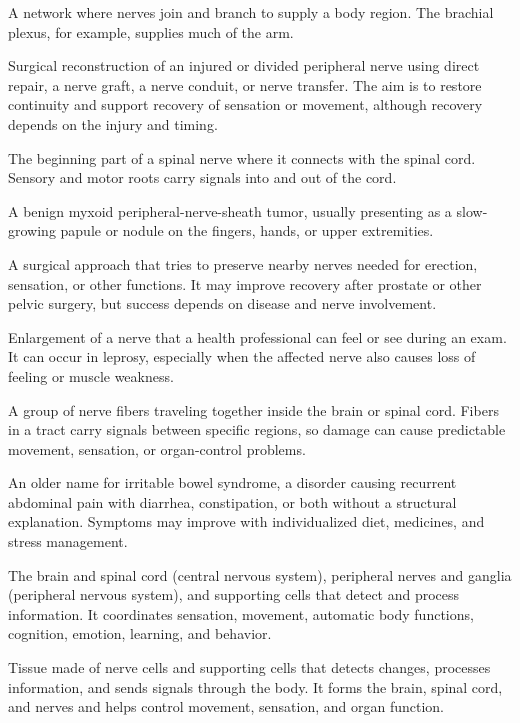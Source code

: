  A network where nerves join and branch to supply a body region. The brachial plexus, for example, supplies much of the arm.

 Surgical reconstruction of an injured or divided peripheral nerve using direct repair, a nerve graft, a nerve conduit, or nerve transfer. The aim is to restore continuity and support recovery of sensation or movement, although recovery depends on the injury and timing.

 The beginning part of a spinal nerve where it connects with the spinal cord. Sensory and motor roots carry signals into and out of the cord.

 A benign myxoid peripheral-nerve-sheath tumor, usually presenting as a slow-growing papule or nodule on the fingers, hands, or upper extremities.

 A surgical approach that tries to preserve nearby nerves needed for erection, sensation, or other functions. It may improve recovery after prostate or other pelvic surgery, but success depends on disease and nerve involvement.

 Enlargement of a nerve that a health professional can feel or see during an exam. It can occur in leprosy, especially when the affected nerve also causes loss of feeling or muscle weakness.

 A group of nerve fibers traveling together inside the brain or spinal cord. Fibers in a tract carry signals between specific regions, so damage can cause predictable movement, sensation, or organ-control problems.

 An older name for irritable bowel syndrome, a disorder causing recurrent abdominal pain with diarrhea, constipation, or both without a structural explanation. Symptoms may improve with individualized diet, medicines, and stress management.

 The brain and spinal cord (central nervous system), peripheral nerves and ganglia (peripheral nervous system), and supporting cells that detect and process information. It coordinates sensation, movement, automatic body functions, cognition, emotion, learning, and behavior.

 Tissue made of nerve cells and supporting cells that detects changes, processes information, and sends signals through the body. It forms the brain, spinal cord, and nerves and helps control movement, sensation, and organ function.

